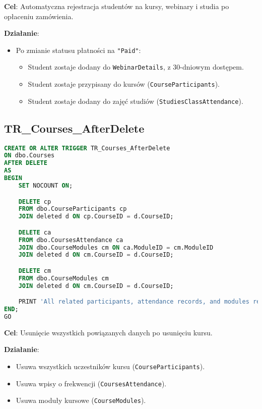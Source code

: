 \documentclass[12pt]{article}
\begin{document}
\noindent \textbf{Cel}: Automatyczna rejestracja studentów na kursy, webinary i studia po opłaceniu zamówienia.  

\noindent \textbf{Działanie}:  
\begin{itemize}
    \item Po zmianie statusu płatności na \texttt{"Paid"}:
    \begin{itemize}
        \item Student zostaje dodany do \texttt{WebinarDetails}, z 30-dniowym dostępem.
        \item Student zostaje przypisany do kursów (\texttt{CourseParticipants}).
        \item Student zostaje dodany do zajęć studiów (\texttt{StudiesClassAttendance}).
    \end{itemize}
\end{itemize}

\vspace{1em}

\subsection{TR\_Courses\_AfterDelete}

\begin{lstlisting}[language=SQL]
CREATE OR ALTER TRIGGER TR_Courses_AfterDelete
ON dbo.Courses
AFTER DELETE
AS
BEGIN
    SET NOCOUNT ON;

    DELETE cp
    FROM dbo.CourseParticipants cp
    JOIN deleted d ON cp.CourseID = d.CourseID;

    DELETE ca
    FROM dbo.CoursesAttendance ca
    JOIN dbo.CourseModules cm ON ca.ModuleID = cm.ModuleID
    JOIN deleted d ON cm.CourseID = d.CourseID;

    DELETE cm
    FROM dbo.CourseModules cm
    JOIN deleted d ON cm.CourseID = d.CourseID;

    PRINT 'All related participants, attendance records, and modules removed.';
END;
GO
\end{lstlisting}


\noindent \textbf{Cel}: Usunięcie wszystkich powiązanych danych po usunięciu kursu.  

\noindent \textbf{Działanie}:  
\begin{itemize}
    \item Usuwa wszystkich uczestników kursu (\texttt{CourseParticipants}).
    \item Usuwa wpisy o frekwencji (\texttt{CoursesAttendance}).
    \item Usuwa moduły kursowe (\texttt{CourseModules}).
\end{itemize}
\end{document}
